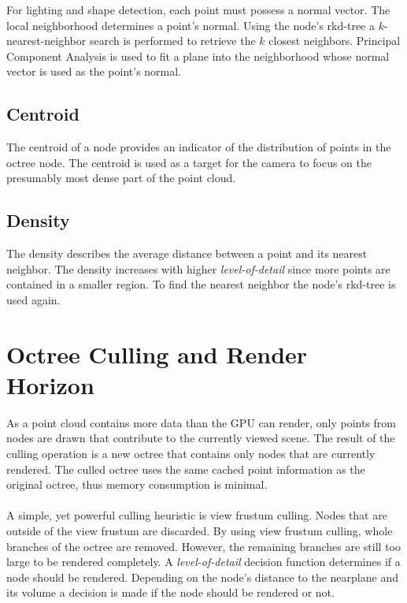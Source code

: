 For lighting and shape detection, each point must possess a normal vector. The local neighborhood determines a point's normal. Using the node's rkd-tree a $k$-nearest-neighbor search is performed to retrieve the $k$ closest neighbors. Principal Component Analysis \cite{jolliffe2002principal} is used to fit a plane into the neighborhood whose normal vector is used as the point's normal.


\subsection{Centroid}

The centroid of a node provides an indicator of the distribution of points in the octree node. The centroid is used as a target for the camera to focus on the presumably most dense part of the point cloud. 


\subsection{Density}

The density describes the average distance between a point and its nearest neighbor. The density increases with higher \textit{level-of-detail} since more points are contained in a smaller region. To find the nearest neighbor the node's rkd-tree is used again.


\section{Octree Culling and Render Horizon}
\label{sec:renderHorizon}

As a point cloud contains more data than the GPU can render, only points from nodes are drawn that contribute to the currently viewed scene. The result of the culling operation is a new octree that contains only nodes that are currently rendered. The culled octree uses the same cached point information as the original octree, thus memory consumption is minimal. 
\\
\\
A simple, yet powerful culling heuristic is view frustum culling. Nodes that are outside of the view frustum are discarded. By using view frustum culling, whole branches of the octree are removed. However, the remaining branches are still too large to be rendered completely. A \textit{level-of-detail} decision function determines if a node should be rendered. Depending on the node's distance to the nearplane and its volume a decision is made if the node should be rendered or not. 

